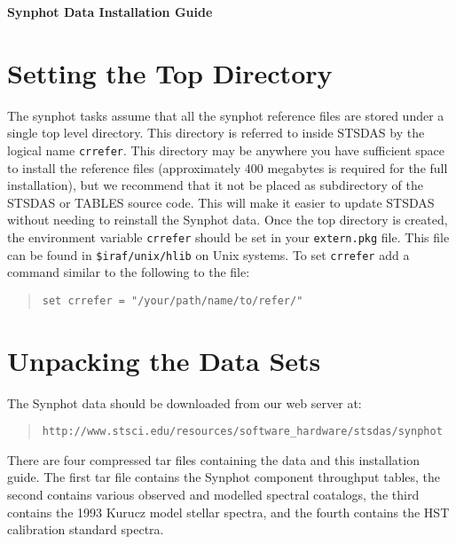 \documentclass{article}
\begin{document}
\pagestyle{plain}

\begin{center}
{\LARGE \bf Synphot Data Installation Guide}
\end{center}

\vspace{6ex}

\section{Setting the Top Directory}

The synphot tasks assume that all the synphot reference files are
stored under a single top level directory. This directory is referred
to inside STSDAS by the logical name {\tt crrefer}. This directory
may be anywhere you have sufficient space to install the reference
files (approximately 400 megabytes is required for the full
installation), but we recommend that it not be placed as subdirectory
of the STSDAS or TABLES source code. This will make it easier to
update STSDAS without needing to reinstall the Synphot data. Once the
top directory is created, the environment variable {\tt crrefer}
should be set in your {\tt extern.pkg} file. This file can be found in
{\tt \$iraf/unix/hlib} on Unix systems.
To set {\tt crrefer} add a command similar to the following
to the file:

\begin{quote}\begin{verbatim}
set crrefer = "/your/path/name/to/refer/"
\end{verbatim}\end{quote}

\section{Unpacking the Data Sets}

The Synphot data should be downloaded from our web server at:

\begin{quote}\begin{verbatim}
http://www.stsci.edu/resources/software_hardware/stsdas/synphot
\end{verbatim}\end{quote}

There are four compressed tar files containing the data and this
installation guide. The first tar file contains the Synphot component
throughput tables, the second contains various observed and modelled
spectral coatalogs, the third contains the 1993 Kurucz model stellar
spectra, and the fourth contains the HST calibration standard
spectra.
\end{document}
